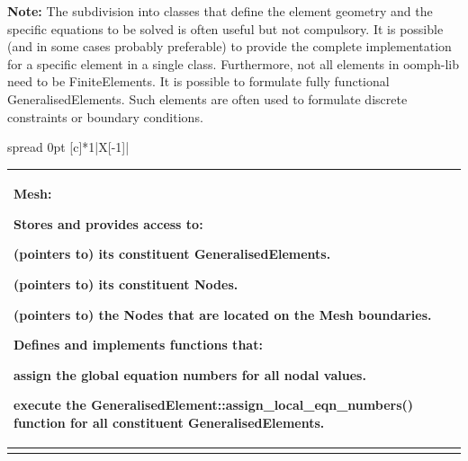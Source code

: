 \begin{center} \end{center} 

{\bfseries Note\+:} The subdivision into classes that define the element geometry and the specific equations to be solved is often useful but not compulsory. It is possible (and in some cases probably preferable) to provide the complete implementation for a specific element in a single class. Furthermore, not all elements in {\ttfamily oomph-\/lib} need to be {\ttfamily Finite\+Elements}. It is possible to formulate fully functional Generalised\+Elements. Such elements are often used to formulate discrete constraints or boundary conditions.

\begin{center} \tabulinesep=1mm
\begin{longtabu} spread 0pt [c]{*{1}{|X[-1]}|}
\hline
\begin{center} \begin{tabularx}{\linewidth}{|*{1}{>{\raggedright\arraybackslash}X|}}\hline
\begin{center} {\bfseries Mesh\+:} \end{center} 
\begin{DoxyItemize}
\item Stores and provides access to\+:
\begin{DoxyItemize}
\item (pointers to) its constituent {\ttfamily Generalised\+Elements}.
\item (pointers to) its constituent {\ttfamily Nodes}.
\item (pointers to) the {\ttfamily Nodes} that are located on the {\ttfamily Mesh} boundaries.
\end{DoxyItemize}
\item Defines and implements functions that\+:
\begin{DoxyItemize}
\item assign the global equation numbers for all nodal values.
\item execute the {\ttfamily Generalised\+Element\+::assign\+\_\+local\+\_\+eqn\+\_\+numbers()} function for all constituent Generalised\+Elements.   
\end{DoxyItemize}
\end{DoxyItemize}\\\cline{1-1}
\end{tabularx}
\end{center}  \begin{center} \begin{tabularx}{\linewidth}{|*{1}{>{\raggedright\arraybackslash}X|}}\hline

\end{tabularx}
\end{center}
\end{longtabu}
\end{center}
